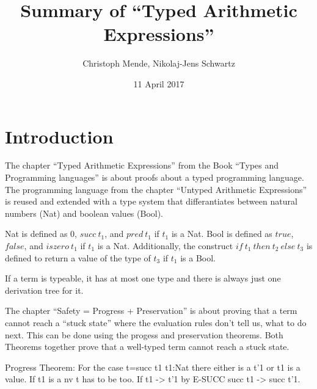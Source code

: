 \documentclass[acmlarge]{acmart}
\begin{document}

\title{Summary of ``Typed Arithmetic Expressions''}
\author{Christoph Mende, Nikolaj-Jens Schwartz}
\date{11 April 2017}
\maketitle

\section{Introduction}

The chapter ``Typed Arithmetic Expressions'' from the Book ``Types and Programming languages''\cite{Pierce:2002:TPL:509043} is about proofs about a typed programming language. The programming language from the chapter ``Untyped Arithmetic Expressions'' is reused and extended with a type system that differantiates between natural numbers (Nat) and boolean values (Bool).

Nat is defined as 0, $succ\ t_1$, and $pred\ t_1$ if $t_1$ is a Nat. Bool is defined as $true$, $false$, and $iszero\ t_1$ if $t_1$ is a Nat. Additionally, the construct $if\ t_1\ then\ t_2\ else\ t_3$ is defined to return a value of the type of $t_3$ if $t_1$ is a Bool.

If a term is typeable, it has at most one type and there is always just one derivation tree for it.


The chapter ``Safety = Progress + Preservation'' is about proving that a term cannot reach a ``stuck state'' where the evaluation rules don't tell us, what to do next. This can be done using the progess and preservation theorems. Both Theorems together prove that a well-typed term cannot reach a stuck state.

Progress Theorem:
For the case t=succ t1 t1:Nat there either is a t'1 or t1 is a value. If t1 is a nv t has to be too.
If t1 -> t'1 by E-SUCC succ t1 -> succ t'1.



\end{document}

